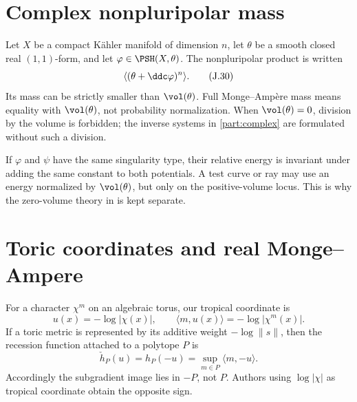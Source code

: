 \section{Complex nonpluripolar mass}
\label{sec:appJ-complex-mass}

Let \(X\) be a compact K\"ahler manifold of dimension \(n\), let \(\theta\) be
a smooth closed real \((1,1)\)-form, and let \(\varphi\in\PSH(X,\theta)\).
The nonpluripolar product is written
\begin{equation*}
 \langle(\theta+\ddc\varphi)^n\rangle.
 \tag{J.30}\label{eq:appJ-npp}
\end{equation*}
Its mass can be strictly smaller than \(\vol(\theta)\).  Full Monge--Amp\`ere
mass means equality with \(\vol(\theta)\), not probability normalization.
When \(\vol(\theta)=0\), division by the volume is forbidden; the inverse
systems in \cref{part:complex} are formulated without such a division.

If \(\varphi\) and \(\psi\) have the same singularity type, their relative
energy is invariant under adding the same constant to both potentials.  A
test curve or ray may use an energy normalized by \(\vol(\theta)\), but only
on the positive-volume locus.  This is why the zero-volume theory in
 is
kept separate.

\section{Toric coordinates and real Monge--Ampere}
\label{sec:appJ-toric}

For a character \(\chi^m\) on an algebraic torus, our tropical coordinate is
\begin{equation*}
 u(x)=-\log|\chi(x)|,
 \qquad
 \langle m,u(x)\rangle=-\log|\chi^m(x)|.
 \tag{J.31}\label{eq:appJ-toric-coordinate}
\end{equation*}
If a toric metric is represented by its additive weight
\(-\log\|s\|\), then the recession function attached to a polytope \(P\) is
\begin{equation*}
 \check h_P(u)=h_P(-u)=\sup_{m\in P}\langle m,-u\rangle.
 \tag{J.32}\label{eq:appJ-toric-recession}
\end{equation*}
Accordingly the subgradient image lies in \(-P\), not \(P\).  Authors using
\(\log|\chi|\) as tropical coordinate obtain the opposite sign.

